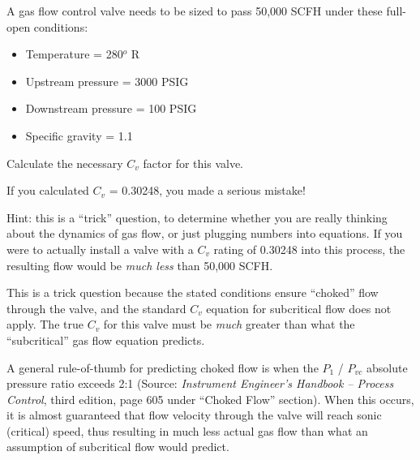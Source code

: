 

A gas flow control valve needs to be sized to pass 50,000 SCFH under these full-open conditions:

\begin{itemize}
\item{}Temperature = 280$^{o}$ R
\item{}Upstream pressure = 3000 PSIG
\item{}Downstream pressure = 100 PSIG
\item{}Specific gravity = 1.1
\end{itemize} 
 
Calculate the necessary $C_{v}$ factor for this valve.
 






If you calculated $C_{v}$ = 0.30248, you made a serious mistake!
 
\vskip 10pt

Hint: this is a ``trick'' question, to determine whether you are really thinking about the dynamics of gas flow, or just plugging numbers into equations.  If you were to actually install a valve with a $C_{v}$ rating of 0.30248 into this process, the resulting flow would be {\it much less} than 50,000 SCFH.







This is a trick question because the stated conditions ensure ``choked'' flow through the valve, and the standard $C_{v}$ equation for subcritical flow does not apply.  The true $C_{v}$ for this valve must be {\it much} greater than what the ``subcritical'' gas flow equation predicts.

A general rule-of-thumb for predicting choked flow is when the $P_1$ / $P_{vc}$ absolute pressure ratio exceeds 2:1 (Source: {\it Instrument Engineer's Handbook -- Process Control}, third edition, page 605 under ``Choked Flow'' section).  When this occurs, it is almost guaranteed that flow velocity through the valve will reach sonic (critical) speed, thus resulting in much less actual gas flow than what an assumption of subcritical flow would predict.

